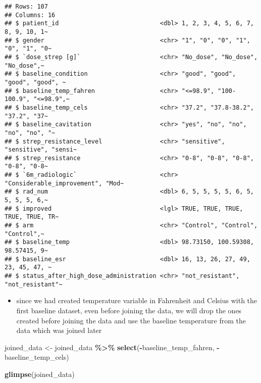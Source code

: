 \documentclass[
]{article}
\newenvironment{Shaded}{\begin{snugshade}}{\end{snugshade}}
\newcommand{\FunctionTok}[1]{\textcolor[rgb]{0.13,0.29,0.53}{\textbf{#1}}}
\newcommand{\NormalTok}[1]{#1}
\newcommand{\OtherTok}[1]{\textcolor[rgb]{0.56,0.35,0.01}{#1}}
\newcommand{\SpecialCharTok}[1]{\textcolor[rgb]{0.81,0.36,0.00}{\textbf{#1}}}
\providecommand{\tightlist}{%
  \setlength{\itemsep}{0pt}\setlength{\parskip}{0pt}}
\begin{document}
\begin{verbatim}
## Rows: 107
## Columns: 16
## $ patient_id                            <dbl> 1, 2, 3, 4, 5, 6, 7, 8, 9, 10, 1~
## $ gender                                <chr> "1", "0", "0", "1", "0", "1", "0~
## $ `dose_strep [g]`                      <chr> "No_dose", "No_dose", "No_dose",~
## $ baseline_condition                    <chr> "good", "good", "good", "good", ~
## $ baseline_temp_fahren                  <chr> "<=98.9", "100-100.9", "<=98.9",~
## $ baseline_temp_cels                    <chr> "37.2", "37.8-38.2", "37.2", "37~
## $ baseline_cavitation                   <chr> "yes", "no", "no", "no", "no", "~
## $ strep_resistance_level                <chr> "sensitive", "sensitive", "sensi~
## $ strep_resistance                      <chr> "0-8", "0-8", "0-8", "0-8", "0-8~
## $ `6m_radiologic`                       <chr> "Considerable_improvement", "Mod~
## $ rad_num                               <dbl> 6, 5, 5, 5, 5, 6, 5, 5, 5, 5, 6,~
## $ improved                              <lgl> TRUE, TRUE, TRUE, TRUE, TRUE, TR~
## $ arm                                   <chr> "Control", "Control", "Control",~
## $ baseline_temp                         <dbl> 98.73150, 100.59308, 98.57415, 9~
## $ baseline_esr                          <dbl> 16, 13, 26, 27, 49, 23, 45, 47, ~
## $ status_after_high_dose_administration <chr> "not_resistant", "not_resistant"~
\end{verbatim}

\begin{itemize}
\tightlist
\item
  since we had created temperature variable in Fahrenheit and Celsius
  with the first baseline dataset, even before joining the data, we will
  drop the ones created before joining the data and use the baseline
  temperature from the data which was joined later
\end{itemize}

\begin{Shaded}
\begin{Highlighting}[]
\NormalTok{joined\_data }\OtherTok{\textless{}{-}}\NormalTok{ joined\_data }\SpecialCharTok{\%\textgreater{}\%} \FunctionTok{select}\NormalTok{(}\SpecialCharTok{{-}}\NormalTok{baseline\_temp\_fahren, }\SpecialCharTok{{-}}\NormalTok{baseline\_temp\_cels)}

\FunctionTok{glimpse}\NormalTok{(joined\_data)}
\end{Highlighting}
\end{Shaded}
\end{document}
